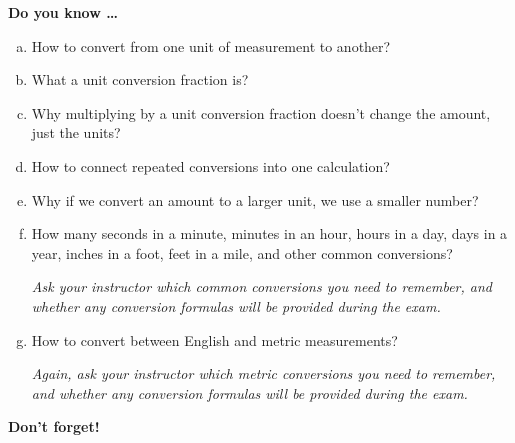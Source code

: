 \newpage



\bigskip

\noindent \textbf{Do you know \ldots} %

\begin{enumerate} [(a)]
\item How to convert from one unit of measurement to another?   
\item What a unit conversion fraction is?   
\item Why multiplying by a unit conversion fraction doesn't change the amount, just the units?   
\item How to connect repeated conversions into one calculation?   
\item Why if we convert an amount to a larger unit, we use a smaller number?  
\item How many seconds in a minute, minutes in an hour, hours in a day, days in a year, inches in a foot, feet in a mile, and other common conversions? 

\emph{Ask your instructor which common conversions you need to remember, and whether any conversion formulas will be provided during the exam.}   
\item How to convert between English and metric measurements? 

\emph{Again, ask your instructor which metric conversions you need to remember, and whether any conversion formulas will be provided during the exam.} 
\end{enumerate}

\bigskip

\noindent \textbf{Don't forget!}
